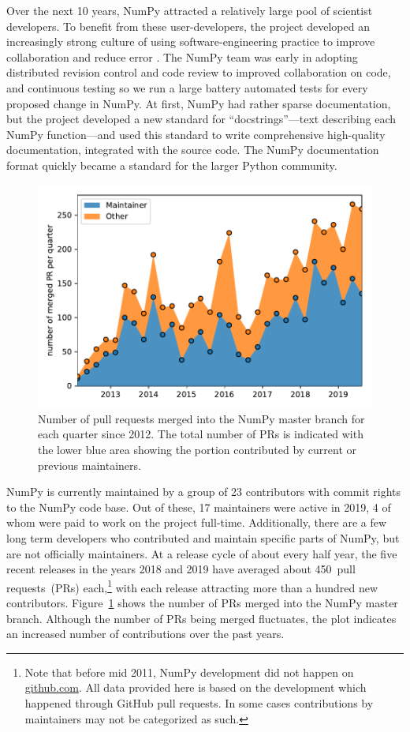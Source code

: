 Over the next 10 years, NumPy attracted a relatively large pool of scientist
developers.  To benefit from these
user-developers, the project developed an increasingly strong culture of using
software-engineering practice to improve collaboration and reduce error
\cite{millman2014developing}. The NumPy team was early in adopting distributed
revision control and code review to improved collaboration on code, and
continuous testing so we run a large battery automated tests for every proposed
change in NumPy. At first, NumPy had rather sparse documentation, but the project
developed a new standard for ``docstrings''---text describing each NumPy
function---and used this standard to write comprehensive high-quality
documentation, integrated with the source code. The NumPy documentation format
quickly became a standard for the larger Python community.

\begin{figure}
    \centering
    \includegraphics[width=0.9\linewidth]{scripts/PRs-using-CURRENT_MAINTAINERS.pdf}
    \caption{Number of pull requests merged into the NumPy master branch for each
        quarter since 2012. The total number of PRs is indicated with the
        lower blue area showing the portion contributed by current or previous
        maintainers.}\label{fig:prs-over-time}
\end{figure}

NumPy is currently maintained by a group of 23 contributors with commit rights
to the NumPy code base. Out of these, 17 maintainers were active in
2019, 4 of whom were paid to work on the project full-time.
Additionally, there are a few long term developers who contributed and maintain
specific parts of NumPy, but are not officially maintainers.
At a release cycle of about every half year, the five recent releases in the years
2018 and 2019 have averaged about 450~pull requests~(PRs) each,\footnote{
    Note that before mid 2011, NumPy development did not happen on \url{github.com}.
    All data provided here is based on the development which happened through GitHub
    pull requests. In some cases contributions by maintainers may not be categorized as such.}
with each release attracting more than a hundred new contributors.
Figure~\ref{fig:prs-over-time} shows the number of PRs merged into the NumPy
master branch.
Although the number of PRs being merged fluctuates,
the plot indicates an increased number of contributions over the past
years.

